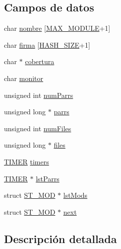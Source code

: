 \subsection*{Campos de datos}
\begin{DoxyCompactItemize}
\item 
char \hyperlink{struct_s_t___m_o_d_a59b9df3193b6f874922b75715fc1bc81}{nombre} \mbox{[}\hyperlink{sdpconfig_8h_a6611b3fba9de26203f14407743b750cc}{M\+A\+X\+\_\+\+M\+O\+D\+U\+L\+E}+1\mbox{]}
\item 
char \hyperlink{struct_s_t___m_o_d_a11de7bbb4add4ed0cf596ea7a05cb841}{firma} \mbox{[}\hyperlink{sdpconfig_8h_ad6074dd11ab3c97c8135c43aab03ae95}{H\+A\+S\+H\+\_\+\+S\+I\+Z\+E}+1\mbox{]}
\item 
char $\ast$ \hyperlink{struct_s_t___m_o_d_a512e0b2cea6bba7a1eaf1689e8000374}{cobertura}
\item 
char \hyperlink{struct_s_t___m_o_d_a41aafff34874651f2469d2d622a7d60d}{monitor}
\item 
unsigned int \hyperlink{struct_s_t___m_o_d_ab769f67b1f859e497d6476cf44f4e02d}{num\+Parrs}
\item 
unsigned long $\ast$ \hyperlink{struct_s_t___m_o_d_abc198cd7e81f42b66805a17af197de12}{parrs}
\item 
unsigned int \hyperlink{struct_s_t___m_o_d_a9dbd5dd0bbfa51a355303896a2f70f76}{num\+Files}
\item 
unsigned long $\ast$ \hyperlink{struct_s_t___m_o_d_a70ab4319156766461ca994c2e7550d7d}{files}
\item 
\hyperlink{sdp_types_8h_a94c0315eea22344f1e853cc7c90592bb}{T\+I\+M\+E\+R} \hyperlink{struct_s_t___m_o_d_a90cdafff165917e473b00614b8fb8c18}{timers}
\item 
\hyperlink{sdp_types_8h_a94c0315eea22344f1e853cc7c90592bb}{T\+I\+M\+E\+R} $\ast$ \hyperlink{struct_s_t___m_o_d_abab69541867571865a674d938141fcf9}{lst\+Parrs}
\item 
struct \hyperlink{struct_s_t___m_o_d}{S\+T\+\_\+\+M\+O\+D} $\ast$ \hyperlink{struct_s_t___m_o_d_a2f7d75b93f5c1884691f10a146c7bb43}{lst\+Mods}
\item 
struct \hyperlink{struct_s_t___m_o_d}{S\+T\+\_\+\+M\+O\+D} $\ast$ \hyperlink{struct_s_t___m_o_d_a45ca635407e332df9a3b7e72768eb926}{next}
\end{DoxyCompactItemize}


\subsection{Descripción detallada}


